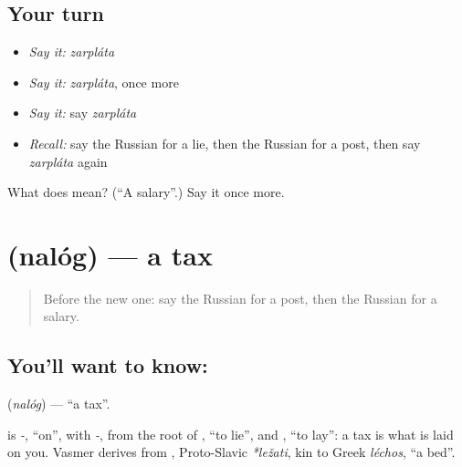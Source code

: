 \subsection*{Your turn}
\begin{itemize}
\raggedright
  \item \emph{Say it:} \emph{zarpláta}
  \item \emph{Say it:} \emph{zarpláta}, once more
  \item \emph{Say it:} say \emph{zarpláta}
  \item \emph{Recall:} say the Russian for a lie, then the Russian for a post, then say \emph{zarpláta} again
\end{itemize}

\begin{tcolorbox}[breakable,colback=teal!4,colframe=teal!35!black,title={Before you move on}]
What does  mean? (\textquotedblleft{}A salary\textquotedblright{}.) Say it once more.
\end{tcolorbox}
\section[\texorpdfstring{\ru{налог} (nalóg)}{налог (nalóg)}]{ (nalóg) — a tax}

\label{lesson:RU-C170-nalog}



\begin{quote}
Before the new one: say the Russian for a post, then the Russian for a salary.
\end{quote}

\subsection*{You'll want to know: }
\textbf{} (\emph{nalóg}) — \textquotedblleft{}a tax\textquotedblright{}.

\begin{cousinweb}
\textbf{} is \emph{-}, \textquotedblleft{}on\textquotedblright{}, with \emph{-}, from the root of \emph{}, \textquotedblleft{}to lie\textquotedblright{}, and \emph{}, \textquotedblleft{}to lay\textquotedblright{}: a tax is what is laid on you. Vasmer derives \emph{} from \emph{}, Proto-Slavic \emph{*ležati}, kin to Greek \emph{léchos}, \textquotedblleft{}a bed\textquotedblright{}.
\end{cousinweb}


